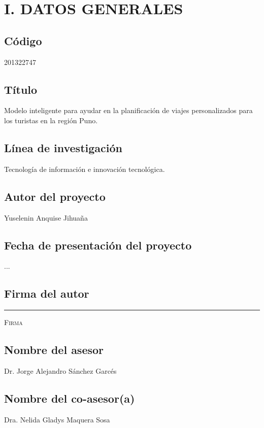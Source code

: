\chapter{I. DATOS GENERALES}
\section{Código}
201322747
\section{Título}
Modelo inteligente para ayudar en la planificación de viajes personalizados para los turistas en la región Puno.
\section{Línea de investigación}
Tecnología de información e innovación tecnológica.
\section{Autor del proyecto}
Yuselenin Anquise Jihuaña
\section{Fecha de presentación del proyecto}
...
\section{Firma del autor}
{
\vspace{8em}
\centering
\rule[1em]{20em}{0.5pt} %
\textsc{Firma}
}
\section{Nombre del asesor}
Dr. Jorge Alejandro Sánchez Garcés
\section{Nombre del co-asesor(a)}
Dra. Nelida Gladys Maquera Sosa
